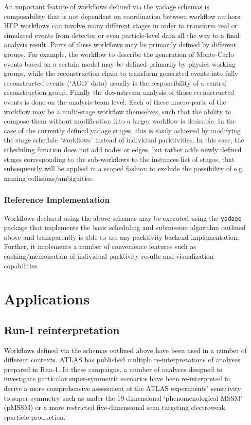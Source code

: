 \documentclass[a4paper]{jpconf}
\begin{document}
An important feature of workflows defined via the yadage schemas is composability that is not dependent on coordination between workflow authors. HEP workflows can involve many different stages in order to transform real or simulated events from detector or even particle-level data all the way to a final analysis result. Parts of these workflows may be primarily defined by different groups. For example, the workflow to describe the generation of Monte-Carlo events based on a certain model may be defined primarily by physics working groups, while the reconstruction chain to transform generated events into fully reconstructed events (`AOD' data) usually is the responsibility of a central reconstruction group. Finally the downstream analysis of those reconstructed events is done on the analysis-team level. Each of these macro-parts of the workflow may be a multi-stage workflow themselves, such that the ability to compose them without modification into a larger workflow is desirable. In the case of the currently defined yadage stages, this is easily achieved by modifying the stage schedule 'workflows' instead of individual packtivities. In this case, the scheduling function does not add nodes or edges, but rather adds newly defined stages corresponding to the sub-workflows to the instances list of stages, that subsequently will be applied in a scoped fashion to exclude the possibility of e.g. naming collisions/ambiguities.

\subsubsection{Reference Implementation}

Workflows declared using the above schemas may be executed using the \verb+yadage+ package\cite{yadage} that implements the basic scheduling and submission algorithm outlined above and transparently is able to use any packtivity backend implementation. Further, it implements a number of convenience features such as caching/memoization of individual packtivity results and visualization capabilities.  

\section{Applications}

\subsection{Run-I reinterpretation}
Workflows defined via the schemas outlined above have been used in a number of different contexts. ATLAS has published multiple re-interpretations of analyses prepared in Run-1. In these campaigns, a number of analyses designed to investigate particular super-symmetric scenarios have been re-interpreted to derive a more comprehensive assessment of the ATLAS experiments' sensitivity to super-symmetry such as under the 19-dimensional `phenomenological MSSM' (pMSSM) or a more restricted five-dimensional scan targeting electroweak sparticle production\cite{Aad:2015baa,Aaboud:2016wna,ATLAS-CONF-2016-033}.
\end{document}
